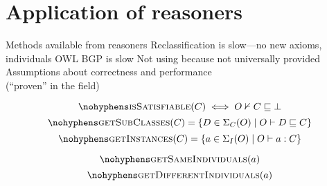 \documentclass[paper.tex]{subfiles}
\begin{document}
\section{Application of reasoners}
\label{sec:reasoners}

\begin{todos}
  \todo Methods available from reasoners
  \todo Reclassification is slow---no new axioms, individuals
  \todo OWL BGP is slow
  \todo Not using  because not universally provided
  \todo Assumptions about correctness and performance \\(``proven'' in the field)
\end{todos}

\todo[in ontology $O$]

\[ \textproc{isSatisfiable}(C) \iff O \nsementails C \sqsubseteq \bot \]
\[ \textproc{getSubClasses}(C) = \{ D \in \signature_C(O) \mid O \sementails D \sqsubseteq C \} \]
\[ \textproc{getInstances}(C) = \{ a \in \signature_I(O) \mid O \sementails a : C \} \]

\[ \textproc{getSameIndividuals}(a) \]
\[ \textproc{getDifferentIndividuals}(a) \]

\end{document}
